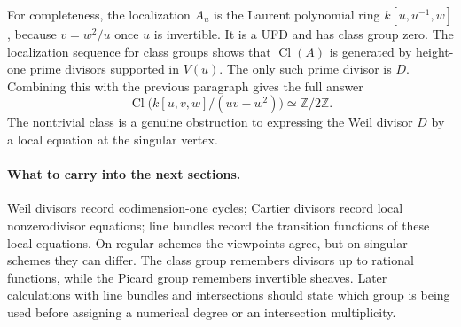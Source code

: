 For completeness, the localization $A_u$ is the Laurent
polynomial ring $k[u,u^{-1},w]$, because $v=w^2/u$ once $u$ is
invertible.  It is a UFD and has class group zero.  The localization
sequence for class groups shows that $\operatorname{Cl}(A)$ is
generated by height-one prime divisors supported in $V(u)$.
The only such prime divisor is $D$.  Combining this with the
previous paragraph gives the full answer
\[
 \operatorname{Cl}\bigl(k[u,v,w]/(uv-w^2)\bigr)
     \simeq\mathbb Z/2\mathbb Z.
\]
The nontrivial class is a genuine obstruction to expressing the
Weil divisor $D$ by a local equation at the singular vertex.

\paragraph{What to carry into the next sections.}
Weil divisors record codimension-one cycles; Cartier divisors
record local nonzerodivisor equations; line bundles record the
transition functions of these local equations.  On regular schemes
the viewpoints agree, but on singular schemes they can differ.
The class group remembers divisors up to rational functions, while
the Picard group remembers invertible sheaves.  Later calculations
with line bundles and intersections should state which group is
being used before assigning a numerical degree or an intersection
multiplicity.
